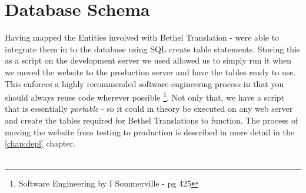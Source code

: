 \documentclass{l3proj}
\begin{document}
\section{Database Schema} \label{sect:db-sch} Having mapped the Entities
involved with Bethel Translation -  were able to integrate them in to the
database using SQL create table statements. Storing this as a script on the
development server we used allowed us to simply run it when we moved the
website to the production server and have the tables ready to use.  This
enforces a highly recommended software engineering process in that you should
always reuse code wherever possible \footnote{Software Engineering by I
Sommerville - pg 425}. Not only that, we have a script that is essentially
\textit{portable} - so it could in theory be executed on any web server and
create the tables required for Bethel Translations to function. The process of
moving the website from testing to production is described in more detail in
the \ref{chap:depl} chapter. \\
\\
\end{document}

